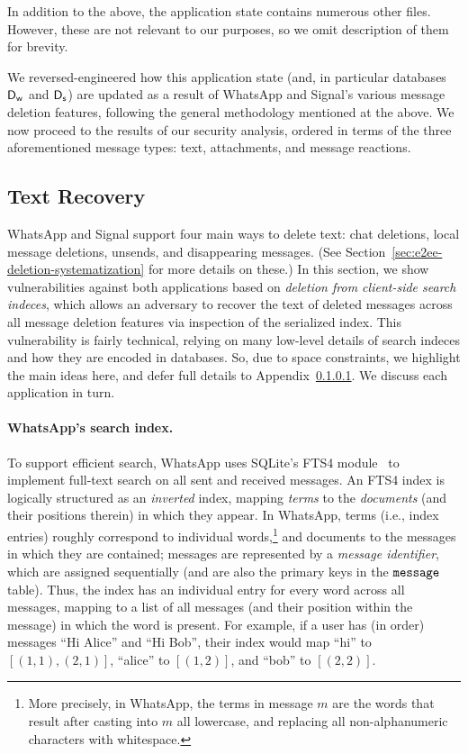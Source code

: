 In addition to the above, the application state contains numerous other files. However, these are not relevant to our purposes, so we omit description of them for brevity.

We reversed-engineered how this application state (and, in particular databases $\textsf{D}_{\textsf{w}}$ and $\textsf{D}_{\textsf{s}}$) are updated as a result of WhatsApp and Signal's various message deletion features, following the general methodology mentioned at the above. We now proceed to the results of our security analysis, ordered in terms of the three aforementioned message types: text, attachments, and message reactions.

\subsection{Text Recovery}\label{subsec:attacks-text}
WhatsApp and Signal support four main ways to delete text: chat deletions, local message deletions, unsends, and disappearing messages. (See Section~\ref{sec:e2ee-deletion-systematization} for more details on these.) In this section, we show vulnerabilities against both applications based on \emph{deletion from client-side search indeces}, which allows an adversary to recover the text of deleted messages across all message deletion features via inspection of the serialized index. This vulnerability is fairly technical, relying on many low-level details of search indeces and how they are encoded in databases. So, due to space constraints, we highlight the main ideas here, and defer full details to Appendix~\ref{}. We discuss each application in turn.

\paragraph{WhatsApp's search index.}
To support efficient search, WhatsApp uses SQLite's FTS4 module~\cite{sqlite-fts4} to implement full-text search on all sent and received messages. An FTS4 index is logically structured as an \emph{inverted} index, mapping \emph{terms} to the \emph{documents} (and their positions therein) in which they appear. In WhatsApp, terms (i.e., index entries) roughly correspond to individual words,\footnote{More precisely, in WhatsApp, the terms in message $m$ are the words that result after casting into $m$ all lowercase, and replacing all non-alphanumeric characters with whitespace.} and documents to the messages in which they are contained; messages are represented by a \emph{message identifier}, which are assigned sequentially (and are also the primary keys in the $\texttt{message}$ table). Thus, the index has an individual entry for every word across all messages, mapping to a list of all messages (and their position within the message) in which the word is present. For example, if a user has (in order) messages ``Hi Alice'' and ``Hi Bob'', their index would map ``hi'' to $[(1, 1), (2, 1)]$, ``alice'' to $[(1, 2)]$, and ``bob'' to $[(2, 2)]$.

